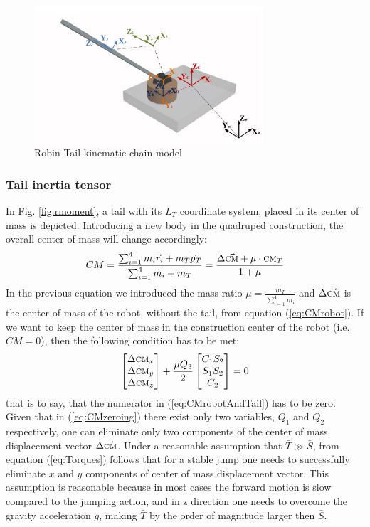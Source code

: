 \begin{figure}
	\centering
	\includegraphics[width=85mm]{./pictures/RobinRepic.pdf}
	\caption{Robin Tail kinematic chain model}
	\label{fig:rmax}
\end{figure}

\subsubsection{Tail inertia tensor}
In Fig. \ref{fig:rmoment}, a tail with its ${L_T}$ coordinate system, placed in its center of mass is depicted. Introducing a new body in the quadruped construction, the overall center of mass will change accordingly:
\begin{equation}\label{eq:CMrobotAndTail}
CM=\frac{\sum_{i=1}^{4}m_i\vec{r}_i+m_T\vec{p}_T}{\sum_{i=1}^{4}m_i+m_T}= \frac{\Delta\vec{\textsc{cm}}+\mu\cdot\textsc{cm}_T}{1+\mu}
\end{equation}
In the previous equation we introduced the mass ratio $\mu=\frac{m_T}{\sum_{i=1}^{4}m_i}$ and $\Delta\vec{\textsc{cm}}$ is the center of mass of the robot, without the tail, from equation (\ref{eq:CMrobot}). If we want to keep the center of mass in the construction center of the robot (i.e. $CM=0$), then the following condition has to be met:
\begin{equation}\label{eq:CMzeroing}
\begin{bmatrix}
\Delta \textsc{cm}_x\\ 
\Delta \textsc{cm}_y\\ 
\Delta \textsc{cm}_z
\end{bmatrix}+
\frac{\mu Q_3}{2}\begin{bmatrix}
C_1S_2\\ 
S_1S_2\\ 
C_2
\end{bmatrix}=0
\end{equation}
that is to say, that the numerator in (\ref{eq:CMrobotAndTail}) has to be zero. Given that in (\ref{eq:CMzeroing}) there exist only two variables, $Q_1$ and $Q_2$ respectively, one can eliminate only two components of the center of mass displacement vector $\Delta \vec{\textsc{cm}}$. Under a reasonable assumption that $\bar{T}\gg \bar{S}$, from equation (\ref{eq:Torques}) follows that for a stable jump one needs to successfully eliminate $x$ and $y$ components of center of mass displacement vector. This assumption is reasonable because in most cases the forward motion is slow compared to the jumping action, and in z direction one needs to overcome the gravity acceleration $g$, making $\bar{T}$ by the order of magnitude larger then $\bar{S}$.

